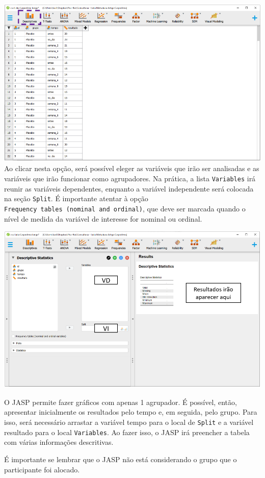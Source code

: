 \documentclass[
]{book}
\begin{document}
\includegraphics{./img/cap_lmm_descriptives.png}
Ao clicar nesta opção, será possível eleger as variáveis que irão ser analisadas e as variáveis que irão funcionar como agrupadores. Na prática, a lista \texttt{Variables} irá reunir as variáveis dependentes, enquanto a variável independente será colocada na seção \texttt{Split}. É importante atentar à opção \texttt{Frequency\ tables\ (nominal\ and\ ordinal)}, que deve ser marcada quando o nível de medida da variável de interesse for nominal ou ordinal.

\includegraphics{./img/cap_lmm_descriptives2.png}

O JASP permite fazer gráficos com apenas 1 agrupador. É possível, então, apresentar inicialmente os resultados pelo tempo e, em seguida, pelo grupo. Para isso, será necessário arrastar a variável tempo para o local de \texttt{Split} e a variável resultado para o local \texttt{Variables}. Ao fazer isso, o JASP irá preencher a tabela com várias informações descritivas.

É importante se lembrar que o JASP não está considerando o grupo que o participante foi alocado.
\end{document}
